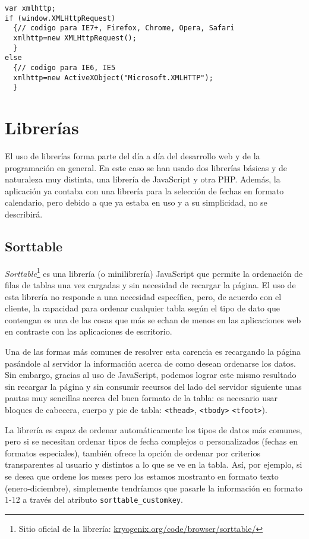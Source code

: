 \begin{lstlisting}
var xmlhttp;
if (window.XMLHttpRequest)
  {// codigo para IE7+, Firefox, Chrome, Opera, Safari
  xmlhttp=new XMLHttpRequest();
  }
else
  {// codigo para IE6, IE5
  xmlhttp=new ActiveXObject("Microsoft.XMLHTTP");
  }
\end{lstlisting}

\section{Librerías}

El uso de librerías forma parte del día a día del desarrollo web y de la
programación en general. En este caso se han usado dos librerías básicas y de
naturaleza muy distinta, una librería de JavaScript y otra PHP. Además, la
aplicación ya contaba con una librería para la selección de fechas en formato
calendario, pero debido a que ya estaba en uso y a su simplicidad, no se
describirá.

\subsection{Sorttable}

\textit{Sorttable}\footnote{Sitio oficial de la librería:
\href{http://www.kryogenix.org/code/browser/sorttable/}{
kryogenix.org/code/browser/sorttable/}} es una librería (o minilibrería)
JavaScript que permite la ordenación de filas de tablas una vez cargadas y sin
necesidad de recargar la página. El uso de esta librería no responde a una
necesidad específica, pero, de acuerdo con el cliente, la capacidad para ordenar
cualquier tabla según el tipo de dato que contengan es una de las cosas que más
se echan de menos en las aplicaciones web en contraste con las aplicaciones de
escritorio.

Una de las formas más comunes de resolver esta carencia es
recargando la página pasándole al servidor la información acerca de como desean
ordenarse los datos. Sin embargo, gracias al uso de JavaScript, podemos lograr
este mismo resultado sin recargar la página y sin consumir recursos del lado
del servidor siguiente unas pautas muy sencillas acerca del buen formato de la
tabla: es necesario usar bloques de cabecera, cuerpo y pie de tabla:
\verb|<thead>|, \verb|<tbody>| \verb|<tfoot>|).

La librería es capaz de ordenar automáticamente los tipos de datos más comunes,
pero si se necesitan ordenar tipos de fecha complejos o personalizados (fechas
en formatos especiales), también ofrece la opción de ordenar por criterios
transparentes al usuario y distintos a lo que se ve en la tabla. Así, por
ejemplo, si se desea que ordene los meses pero los estamos mostranto en formato
texto (enero-diciembre), simplemente tendríamos que pasarle la información en
formato 1-12 a través del atributo \verb|sorttable_customkey|.

